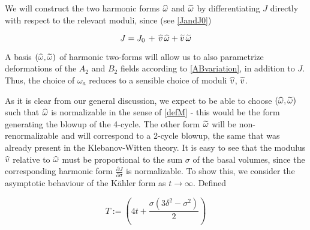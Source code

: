 We will construct the two harmonic forms $\widehat{\omega}$ and $\widetilde{\omega}$ by differentiating $J$ directly with respect to the relevant moduli, since (see \eqref{JandJ0})

\begin{equation}
	J = J_0 \,+ \, \widehat{v} \,\widehat{\omega} + \widetilde{v} \,\widetilde{\omega}
	\label{}
\end{equation}

A basis $(\widehat{\omega},\widetilde{\omega})$ of harmonic two-forms will allow us to also parametrize deformations of the $A_2$ and $B_2$ fields according to \eqref{ABvariation}, in addition to $J$. Thus, the choice of $\omega_a$ reduces to a sensible choice of moduli $\widehat{v}$, $\widetilde{v}$.


%

As it is clear from our general discussion, we expect to be able to choose $(\widehat{\omega},\widetilde{\omega})$ such that $\widehat{\omega}$ is normalizable in the sense of \eqref{defM} - this would be the form generating the blowup of the 4-cycle. The other form $\widetilde{\omega}$ will be non-renormalizable and will correspond to a 2-cycle blowup, the same that was already present in the Klebanov-Witten theory. It is easy to see that the modulus $\widehat{v}$ relative to $\widehat{\omega}$ must be proportional to the sum $\sigma$ of the basal volumes, since the corresponding harmonic form $\frac{\partial J}{\partial \sigma}$ is normalizable. To show this, we consider the asymptotic behaviour of the K\"ahler form as $t\rightarrow \infty$. Defined

\begin{equation}
	T := \left( 4t + \frac{\sigma(3\delta^2 - \sigma^2)}{2} \right)
	\label{}
\end{equation}

